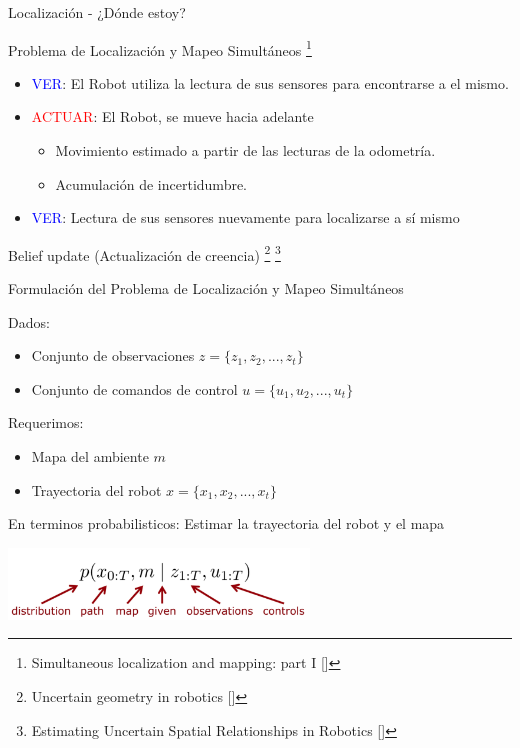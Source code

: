 \documentclass[
  24pt, %
  aspectratio=169, %
]{beamer}
\begin{document}
\begin{frame}{Localización - ¿Dónde estoy?}

  Problema de Localización y Mapeo Simultáneos  \footnote{Simultaneous localization and mapping: part I [\cite{slam_doc}]}
  \bigskip %
  \begin{itemize} 
    \item \textcolor{blue}{VER}: El Robot utiliza la lectura de sus sensores para encontrarse a el mismo.
      \bigskip %
    \item \textcolor{red}{ACTUAR}: El Robot, se mueve hacia adelante
      \begin{itemize}
      \item Movimiento estimado a partir de las lecturas de la odometría.
      \item Acumulación de incertidumbre.
      \end{itemize}
      \bigskip %
    \item \textcolor{blue}{VER}: Lectura de sus sensores nuevamente para localizarse a sí mismo
  \end{itemize}
      
  \bigskip %
  Belief update (Actualización de creencia) \footnote{Uncertain geometry in robotics [\cite{slam_dur}]} \footnote{Estimating Uncertain Spatial Relationships in Robotics [\cite{Smith1988}]}
  
\end{frame}

\begin{frame}{Formulación del Problema de Localización y Mapeo Simultáneos}

  Dados:
  \begin{itemize}
  \item Conjunto de observaciones $z = \{z_1,z_2,...,z_t\}$
  \item Conjunto de comandos de control $u = \{u_1,u_2,...,u_t\}$
  \end{itemize}
  \bigskip %
  Requerimos:
  \begin{itemize}
  \item Mapa del ambiente $m$
  \item Trayectoria del robot $x = \{x_1,x_2,...,x_t\}$
  \end{itemize}
  \bigskip %
  
  En terminos probabilisticos: Estimar la trayectoria del robot y el mapa

  \centering
  \includegraphics[width=8cm]{slam1}
  
\end{frame}
\end{document}
